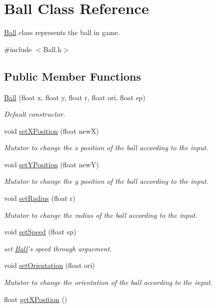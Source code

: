 \hypertarget{classBall}{\section{Ball Class Reference}
\label{classBall}
}


\hyperlink{classBall}{Ball} class represents the ball in game.  




{\ttfamily \#include $<$Ball.\+h$>$}

\subsection*{Public Member Functions}
\begin{DoxyCompactItemize}
\item 
\hyperlink{classBall_a1b8421e23e332c547e0f171d5f78a0d6}{Ball} (float x, float y, float r, float ori, float sp)
\begin{DoxyCompactList}\small\item\em Default constructor. \end{DoxyCompactList}\item 
void \hyperlink{classBall_a6b8992f08c3bc983fd4093f1d9963dfe}{set\+X\+Position} (float new\+X)
\begin{DoxyCompactList}\small\item\em Mutator to change the x position of the ball according to the input. \end{DoxyCompactList}\item 
void \hyperlink{classBall_a9716de6d4d54875e65b455af2758d16e}{set\+Y\+Position} (float new\+Y)
\begin{DoxyCompactList}\small\item\em Mutator to change the y position of the ball according to the input. \end{DoxyCompactList}\item 
void \hyperlink{classBall_a5b2818b0d9db0c5bc8cd54f7753ff752}{set\+Radius} (float r)
\begin{DoxyCompactList}\small\item\em Mutator to change the radius of the ball according to the input. \end{DoxyCompactList}\item 
void \hyperlink{classBall_afe129f1eeb03c5807fb1fb7b9d2b4692}{set\+Speed} (float sp)
\begin{DoxyCompactList}\small\item\em set \hyperlink{classBall}{Ball}'s speed through arguement. \end{DoxyCompactList}\item 
void \hyperlink{classBall_a43c14c96bbf790600fa4160962a4add7}{set\+Orientation} (float ori)
\begin{DoxyCompactList}\small\item\em Mutator to change the orientation of the ball according to the input. \end{DoxyCompactList}\item 
\hypertarget{classBall_a15e418ef954dc616027445d95bbed3be}{float \hyperlink{classBall_a15e418ef954dc616027445d95bbed3be}{get\+X\+Position} ()}\label{classBall_a15e418ef954dc616027445d95bbed3be}


\end{DoxyCompactItemize}
